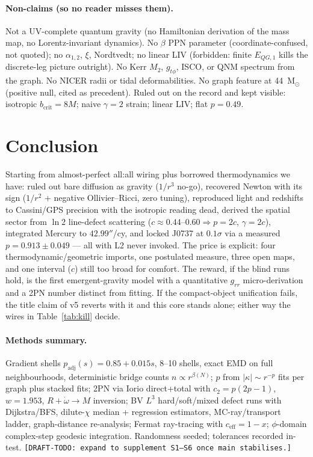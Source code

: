 \documentclass[11pt]{article}
\begin{document}
\paragraph{Non-claims (so no reader misses them).} Not a UV-complete quantum gravity (no Hamiltonian derivation of the mass map, no Lorentz-invariant dynamics). No $\beta$ PPN parameter (coordinate-confused, not quoted); no $\alpha_{1,2}$, $\xi$, Nordtvedt; no linear LIV (forbidden: finite $E_{QG,1}$ kills the discrete-leg picture outright). No Kerr $M_2$, $g_{t\phi}$, ISCO, or QNM spectrum from the graph. No NICER radii or tidal deformabilities. No graph feature at 44~M$_{\odot}$ (positive null, cited as precedent). Ruled out on the record and kept visible: isotropic $b_{\mathrm{crit}} = 8M$; naive $\gamma = 2$ strain; linear LIV; flat $p = 0.49$.

\section{Conclusion}
\label{sec:conclusion}

Starting from almost-perfect all:all wiring plus borrowed thermodynamics we have: ruled out bare diffusion as gravity ($1/r^3$ no-go), recovered Newton with its sign ($1/r^2$ + negative Ollivier--Ricci, zero tuning), reproduced light and redshifts to Cassini/GPS precision with the isotropic reading dead, derived the spatial sector from $\ln 2$ line-defect scattering ($c \approx 0.44$--$0.60 \Rightarrow p = 2c$, $\gamma = 2c$), integrated Mercury to $42.99''$/cy, and locked J0737 at $0.1\sigma$ via a measured $p = 0.913 \pm 0.049$ --- all with L2 never invoked. The price is explicit: four thermodynamic/geometric imports, one postulated measure, three open maps, and one interval ($c$) still too broad for comfort. The reward, if the blind runs hold, is the first emergent-gravity model with a quantitative $g_{rr}$ micro-derivation and a 2PN number distinct from fitting. If the compact-object unification fails, the title claim of v5 reverts with it and this core stands alone; either way the wires in Table~\ref{tab:kill} decide.

\paragraph{Methods summary.} Gradient shells $p_{\mathrm{adj}}(s) = 0.85+0.015s$, 8--10 shells, exact EMD on full neighbourhoods, deterministic bridge counts $n \propto r^{\beta(N)}$; $p$ from $|\kappa| \sim r^{-p}$ fits per graph plus stacked fits; 2PN via Iorio direct+total with $c_2 = p(2p-1)$, $w = 1.953$, $R+\dot\omega \to M$ inversion; BV $L^3$ hard/soft/mixed defect runs with Dijkstra/BFS, dilute-$\chi$ median + regression estimators, MC-ray/transport ladder, graph-distance re-analysis; Fermat ray-tracing with $c_{\mathrm{eff}} = 1-x$; $\phi$-domain complex-step geodesic integration. Randomness seeded; tolerances recorded in-test. \texttt{[DRAFT-TODO: expand to supplement S1--S6 once main stabilises.]}
\end{document}
